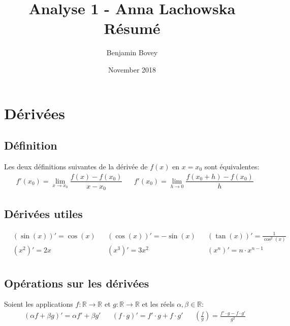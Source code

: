 \documentclass{article}
\title{\vspace{-2cm}Analyse 1 - Anna Lachowska\\Résumé}
\author{Benjamin Bovey}
\date{November 2018}
\numberwithin{equation}{section}
\begin{document}
\maketitle

\section{Dérivées}
\subsection{Définition}
Les deux définitions suivantes de la dérivée de \(f(x)\) en \(x=x_0\) sont équivalentes:
\begin{align*}
	&f'(x_0) = \lim_{x \to x_0} \dfrac{f(x) - f(x_0)}{x - x_0}
	& &f'(x_0) = \lim_{h \to 0} \dfrac{f(x_0 + h) - f(x_0)}{h}
\end{align*}

\subsection{Dérivées utiles}
\begin{align*}
	&(\sin(x))' = \cos(x)		& &(\cos(x))' = -\sin(x)			& &(\tan(x))' = \frac{1}{\cos^2(x)} \\
	&(x^2)' = 2x 				& &(x^3)' = 3x^2				& &(x^n)' = n \cdot x^{n-1} \\
\end{align*}

\subsection{Opérations sur les dérivées}
Soient les applications \(f: \mathbb{R} \to \mathbb{R}\) et \(g: \mathbb{R} \to \mathbb{R}\) et les réels \(\alpha, \beta \in \mathbb{R}\):
\begin{align*}
	&(\alpha f + \beta g)' = \alpha f' + \beta g' 
	& &(f \cdot g)' = f' \cdot g + f \cdot g' 
	& &\left (\frac{f}{g}\right ) = \frac{f' \cdot g - f \cdot g'}{g^2} \\ 
\end{align*}
\end{document}
